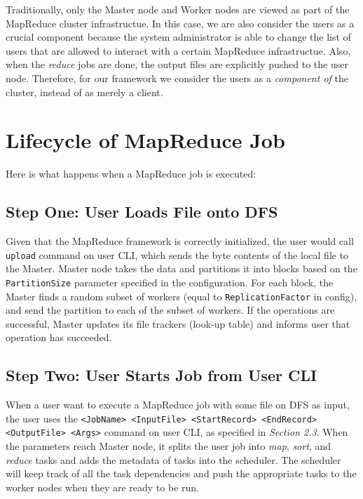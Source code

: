 \documentclass{article} %
\begin{document}
\par\qquad Traditionally, only the Master node and Worker nodes are viewed as part of the MapReduce cluster infrastructue. In this case, we are also consider the users as a crucial component because the system administrator is able to change the list of users that are allowed to interact with a certain MapReduce infrastructue. Also, when the \emph{reduce} jobs are done, the output files are explicitly pushed to the user node. Therefore, for our framework we consider the users as a \emph{component of} the cluster, instead of as merely a client.

\section{Lifecycle of MapReduce Job}
Here is what happens when a MapReduce job is executed:
\subsection*{Step One: User Loads File onto DFS}
\par\qquad Given that the MapReduce framework is correctly initialized, the user would call \texttt{upload} command on user CLI, which sends the byte contents of the local file to the Master.  Master node takes the data and partitions it into blocks based on the \texttt{PartitionSize} parameter specified in the configuration.  For each block, the Master finds a random subset of workers (equal to \texttt{ReplicationFactor} in config), and send the partition to each of the subset of workers.  If the operations are successful, Master updates its file trackers (look-up table) and informs user that operation has succeeded.

\subsection*{Step Two: User Starts Job from User CLI}
\par\qquad When a user want to execute a MapReduce job with some file on DFS as input, the user uses the \texttt{<JobName> <InputFile> <StartRecord> <EndRecord> <OutputFile> <Args>} command on user CLI, as specified in \emph{Section 2.3}. When the parameters reach Master node, it splits the user job into \emph{map}, \emph{sort}, and \emph{reduce} tasks and adds the metadata of tasks into the scheduler. The scheduler will keep track of all the task dependencies and push the appropriate tasks to the worker nodes when they are ready to be run.
\end{document}
